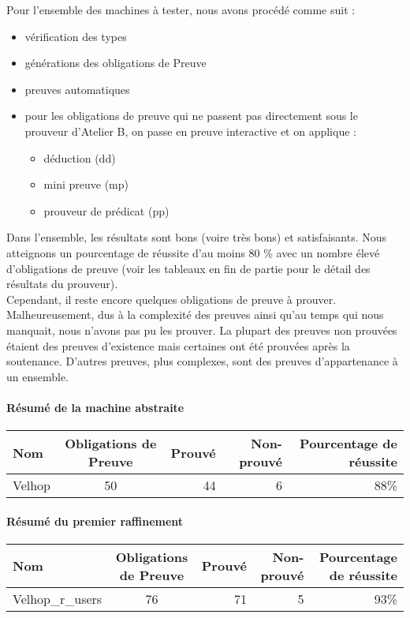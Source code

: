 \documentclass[12pt]{article}
\begin{document}
Pour l'ensemble des machines à tester, nous avons procédé comme suit :
\begin{itemize}
  \item vérification des types
  \item générations des obligations de Preuve
  \item preuves automatiques
  \item pour les obligations de preuve qui ne passent pas directement sous le prouveur d'Atelier B, on passe en preuve interactive et on applique :
  \begin{itemize}
    \item déduction (dd)
    \item mini preuve (mp)
    \item prouveur de prédicat (pp)
  \end{itemize}
\end{itemize}

Dans l'ensemble, les résultats sont bons (voire très bons) et satisfaisants. Nous atteignons un pourcentage de réussite d'au moins 80 \% avec un nombre élevé d'obligations de preuve (voir les tableaux en fin de partie pour le détail des résultats du prouveur).\\

Cependant, il reste encore quelques obligations de preuve à prouver. Malheureusement, dus à la complexité des preuves ainsi qu'au temps qui nous manquait, nous n'avons pas pu les prouver. La plupart des preuves non prouvées étaient des preuves d'existence mais certaines ont été prouvées après la soutenance. D'autres preuves, plus complexes, sont des preuves d'appartenance à un ensemble.
\paragraph{Résumé de la machine abstraite}
\begin{center}
	\begin{tabular}{| l | c | r | r| r |}
		\hline
		Nom & Obligations de Preuve & Prouvé & Non-prouvé & Pourcentage de réussite \\ \hline
		Velhop & 50 & 44 & 6 & 88\% \\ \hline
	\end{tabular}
\end{center}

\paragraph{Résumé du premier raffinement}
\begin{center}
	\begin{tabular}{| l | c | r | r|r|}
		\hline
    Nom & Obligations de Preuve & Prouvé & Non-prouvé & Pourcentage de réussite\\ \hline
    Velhop\_r\_users & 76 & 71 & 5 & 93\% \\ \hline
	\end{tabular}
\end{center}
\end{document}
